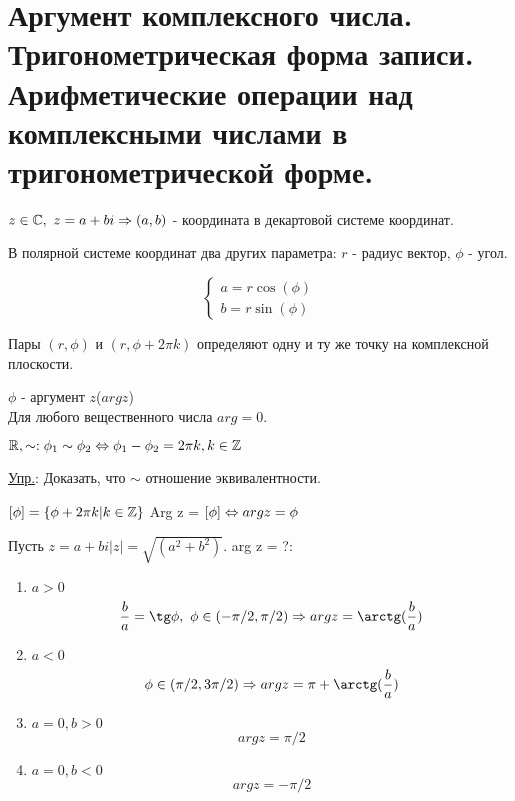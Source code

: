 \section{Аргумент комплексного числа. Тригонометрическая форма записи. Арифметические операции над комплексными числами в тригонометрической форме.}

\begin{center}
\def\svgwidth{6.0cm}

\end{center}

$z \in \mathbb{C},~z = a + bi \Rightarrow (a, b)$ - координата в декартовой системе координат.

В полярной системе координат два других параметра: $r$ - радиус вектор, $\phi$ - угол.

$$
\begin{cases}
	a = r\cos(\phi) \\
	b = r\sin(\phi)
\end{cases}
$$  

Пары $(r, \phi)$ и $(r, \phi + 2 \pi k)$ определяют одну и ту же точку на комплексной плоскости.

\begin{Def}
	$\phi$ - аргумент $z$($arg z$) \\
	\hspace*{1cm}Для любого вещественного числа $arg = 0$.
\end{Def}

$\mathbb{R}, \sim: \phi_1 \sim \phi_2 \Leftrightarrow \phi_1 - \phi_2 = 2 \pi k, k\in \mathbb{Z}$

\underline{Упр.}: Доказать, что $\sim$ отношение эквивалентности.

\begin{Def}
	$[\phi] = \{\phi + 2 \pi k | k \in \mathbb{Z}\}$
	\hspace*{1cm}Arg z = $[\phi] \Leftrightarrow arg z = \phi$
\end{Def}

Пусть $z = a + bi |z| = \sqrt{(a^2 + b^2)}$. arg z = ?: \\
\begin{enumerate}
	\item $a > 0$ 
	$$ \frac{b}{a} = \tg \phi,~\phi \in (-\pi/2, \pi/2) \Ra arg z = \arctg(\frac{b}{a}) $$
	\item $a < 0$ 
	$$ \phi \in (\pi/2, 3 \pi/2) \Ra arg z = \pi + \arctg(\frac{b}{a}) $$
	\item $a = 0, b > 0$
	$$ arg z = \pi/2$$
	\item $a = 0, b < 0$
	$$ arg z = -\pi/2$$
\end{enumerate}

